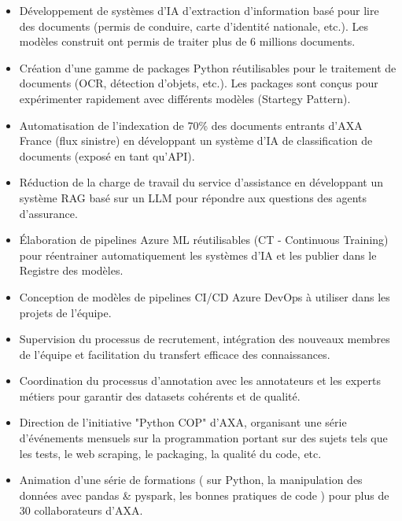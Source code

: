\documentclass[10pt,letter,ragged2e,withhyper]{altacv}
\begin{document}
\begin{paracol}{2}



\begin{itemize}
  \item Développement de systèmes d'IA d'extraction d'information basé pour lire des documents (permis de conduire, carte d'identité nationale, etc.). Les modèles construit ont permis de traiter plus de 6 millions documents.
  \item Création d'une gamme de packages Python réutilisables pour le traitement de documents (OCR, détection d'objets, etc.). Les packages sont conçus pour expérimenter rapidement avec différents modèles (Startegy Pattern).
  \item Automatisation de l'indexation de 70\% des documents entrants d'AXA France (flux sinistre) en développant un système d'IA de classification de documents (exposé en tant qu'API).
  \item Réduction de la charge de travail du service d'assistance en développant un système RAG basé sur un LLM pour répondre aux questions des agents d'assurance.
  \item Élaboration de pipelines Azure ML réutilisables (CT - Continuous Training) pour réentrainer automatiquement les systèmes d'IA et les publier dans le Registre des modèles.
  \item Conception de modèles de pipelines CI/CD Azure DevOps à utiliser dans les projets de l'équipe.
  \item Supervision du processus de recrutement, intégration des nouveaux membres de l'équipe et facilitation du transfert efficace des connaissances.
  \item Coordination du processus d'annotation avec les annotateurs et les experts métiers pour garantir des datasets cohérents et de qualité.
  \item Direction de l'initiative "Python COP" d'AXA, organisant une série d'événements mensuels sur la programmation portant sur des sujets tels que les tests, le web scraping, le packaging, la qualité du code, etc.
  \item Animation d'une série de formations ( sur Python, la manipulation des données avec pandas \& pyspark, les bonnes pratiques de code ) pour plus de 30 collaborateurs d'AXA.
\end{itemize}


\end{paracol}
\end{document}
